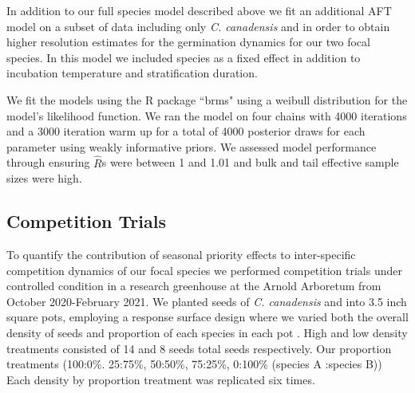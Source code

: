 \documentclass{article}\usepackage[]{graphicx}\usepackage[]{color}
\begin{document}
In addition to our full species model described above we fit an additional AFT model on a subset of data including only \textit{C. canadensis} and in order to obtain higher resolution estimates for the germination dynamics for our two focal species. In this model we included species as a fixed effect in addition to incubation temperature and stratification duration. 

\noindent We fit the models using the R package ``brms" \citep{Burkner2018} using a weibull distribution for the model's likelihood function. We ran the model on four chains with 4000 iterations and a 3000 iteration warm up for a total of 4000 posterior draws for each parameter using weakly informative priors. We assessed  model performance through ensuring $\hat{R}$s were between 1 and 1.01 and bulk and tail effective sample sizes were high.

\subsection{Competition Trials}
\noindent To quantify the contribution of seasonal priority effects to inter-specific competition dynamics of our focal species we performed competition trials under controlled condition in a research greenhouse at the Arnold Arboretum from October 2020-February 2021. We planted seeds of \textit{C. canadensis} and  into 3.5 inch square pots, employing a response surface design where we varied both the overall density of seeds and proportion of each species in each pot \citep{Inouye2001}. High and low density treatments consisted of 14 and 8 seeds total seeds respectively. Our proportion treatments (100:0\%. 25:75\%, 50:50\%, 75:25\%, 0:100\% (species A :species B)) Each density by proportion treatment was replicated six times. %
\end{document}

